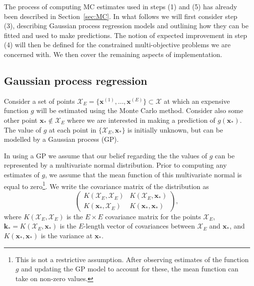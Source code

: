 \documentclass[]{sagej}
\begin{document}
The process of computing MC estimates used in steps (1) and (5) has already been described in Section~\ref{sec:MC}. In what follows we will first consider step (3), describing Gaussian process regression models and outlining how they can be fitted and used to make predictions. The notion of expected improvement in step (4) will then be defined for the constrained multi-objective problems we are concerned with. We then cover the remaining aspects of implementation.


\subsection{Gaussian process regression}\label{sec:GP}

Consider a set of points $\mathcal{X}_{E} = \{ \textbf{x}^{(1)}, \ldots , \textbf{x}^{(E)} \} \subset \mathcal{X}$ at which an expensive function $g$ will be estimated using the Monte Carlo method. Consider also some other point $\mathbf{x}_{*} \not\in \mathcal{X}_{E}$ where we are interested in making a prediction of $g(\mathbf{x}_{*})$. The value of $g$ at each point in $\{\mathcal{X}_{E}, \mathbf{x}_{*}\}$ is initially unknown, but can be modelled by a Gaussian process (GP). 

In using a GP we assume that our belief regarding the the values of $g$ can be represented by a multivariate normal distribution. Prior to computing any estimates of $g$, we assume that the mean function of this multivariate normal is equal to zero\footnote{This is not a restrictive assumption. After observing estimates of the function $g$ and updating the GP model to account for these, the mean function can take on non-zero values.}. We write the covariance matrix of the distribution as
\begin{equation}\label{eqn:cov_matrix}
\begin{pmatrix}
K(\mathcal{X}_{E}, \mathcal{X}_{E}) & K(\mathcal{X}_{E}, \mathbf{x}_{*}) \\
K(\mathbf{x}_{*}, \mathcal{X}_{E}) & K(\mathbf{x}_{*}, \mathbf{x}_{*})
\end{pmatrix},
\end{equation}
where $K(\mathcal{X}_{E}, \mathcal{X}_{E})$ is the $E \times E$ covariance matrix for the points $\mathcal{X}_{E}$, $\mathbf{k}_{*} = K(\mathcal{X}_{E}, \mathbf{x}_{*})$ is the $E$-length vector of covariances between $\mathcal{X}_{E}$ and $\mathbf{x}_{*}$, and $K(\mathbf{x}_{*}, \mathbf{x}_{*})$ is the variance at $\mathbf{x}_{*}$.
\end{document}
